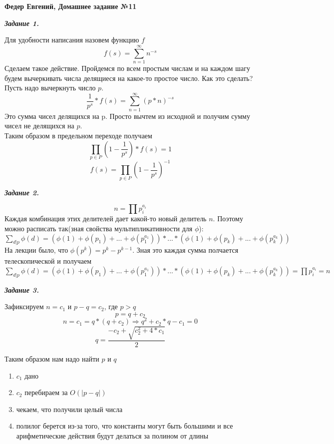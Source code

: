 \documentclass[12pt, a4paper]{scrartcl}
\begin{document}
	\LARGE{\textbf{Федер Евгений, Домашнее задание №11}}\par
	
	\emph{\textbf{Задание 1.}}\par
		Для удобности написания назовем функцию $f$
		$$f(s) = \sum\limits_{n = 1}^{\infty} n ^ {-s} $$
		Сделаем такое действие. Пройдемся по всем простым числам и на каждом шагу будем вычеркивать числа делящиеся на какое-то простое число.	Как это сделать? Пусть надо вычеркнуть число $p$.
		$$\frac{1}{p^s} * f(s) = \sum\limits_{n = 1}^{\infty} (p * n) ^ {-s} $$
		Это сумма чисел делящихся на p. Просто вычтем из исходной и получим сумму чисел не делящихся на $p$. \\
		Таким образом в предельном переходе получаем
		$$ \prod\limits_{p \in P}(1 - \frac{1}{p^s}) * f(s) = 1 $$
		$$ f(s) = \prod\limits_{p \in P}(1 - \frac{1}{p^s}) ^ {-1}$$
	
	\emph{\textbf{Задание 2.}}\par
		$$n = \prod p_i^{a_i}$$
		Каждая комбинация этих делителей дает какой-то новый делитель $n$. Поэтому можно расписать так(зная свойства мультипликативности для $\phi$): \\
		$\sum\limits_{d | p} \phi(d) = (\phi(1) + \phi(p_1) + \text{...} + \phi(p_1^{a_1})) * \text{...} * (\phi(1) + \phi(p_k) + ... + \phi(p_k^{a_k})) $ \\
		На лекции было, что $\phi(p^k) = p^k - p^{k - 1}$. Зная это каждая сумма полчается телескопической и получаем \\
		$\sum\limits_{d | p} \phi(d) = (\phi(1) + \phi(p_1) + \text{...} + \phi(p_1^{a_1})) * \text{...} * (\phi(1) + \phi(p_k) + ... + \phi(p_k^{a_k})) = \prod p_i^{a_i} = n$
		
	\emph{\textbf{Задание 3.}}\par
	Зафиксируем $n = c_1 \text{ и } p - q = c_2$, где $p > q$
	$$p = q + c_2$$
	$$n = c_1 = q * (q + c_2) \Rightarrow q^2 + c_2 * q - c_1 = 0$$
	$$ q = \frac{-c_2 + \sqrt{c_2^2 + 4 * c_1}}{2} $$
	
	Таким образом нам надо найти $p$ и $q$
	\begin{enumerate}
		\item $c_1$ дано
		\item $c_2$ перебираем за $O(|p - q|)$
		\item чекаем, что получили целый числа
		\item полилог берется из-за того, что константы могут быть большими и все арифметические действия будут делаться за полином от длины
	\end{enumerate}
\end{document}
